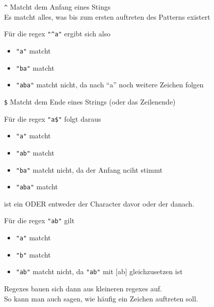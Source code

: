 \documentclass[ignorenonframetext,]{beamer}
\providecommand{\tightlist}{%
  \setlength{\itemsep}{0pt}\setlength{\parskip}{0pt}}
\begin{document}
\begin{frame}

\texttt{\^{}} Matcht dem Anfang eines Stings\\
Es matcht alles, was bis zum ersten auftreten des Patterns existert

Für die regex \texttt{"\^{}a"} ergibt sich also

\begin{itemize}
\tightlist
\item
  \texttt{"a"} matcht
\item
  \texttt{"ba"} matcht
\item
  \texttt{"aba"} matcht nicht, da nach ``a'' noch weitere Zeichen folgen
\end{itemize}

\end{frame}

\begin{frame}

\texttt{\$} Matcht dem Ende eines Strings (oder das Zeilenende)

Für die regex \texttt{"a\$"} folgt daraus

\begin{itemize}
\tightlist
\item
  \texttt{"a"} matcht
\item
  \texttt{"ab"} matcht
\item
  \texttt{"ba"} matcht nicht, da der Anfang nciht stimmt
\item
  \texttt{"aba"} matcht
\end{itemize}

\end{frame}

\begin{frame}

\texttt{\textbar{}} ist ein ODER entweder der Character davor oder der
danach.

Für die regex \texttt{"a\textbar{}b"} gilt

\begin{itemize}
\tightlist
\item
  \texttt{"a"} matcht
\item
  \texttt{"b"} matcht
\item
  \texttt{"ab"} matcht nicht, da \texttt{"a\textbar{}b"} mit {[}ab{]}
  gleichzusetzen ist
\end{itemize}

\end{frame}

\begin{frame}

Regexes bauen sich dann aus kleineren regexes auf.\\
So kann man auch sagen, wie häufig ein Zeichen auftreten soll.

\end{frame}
\end{document}
